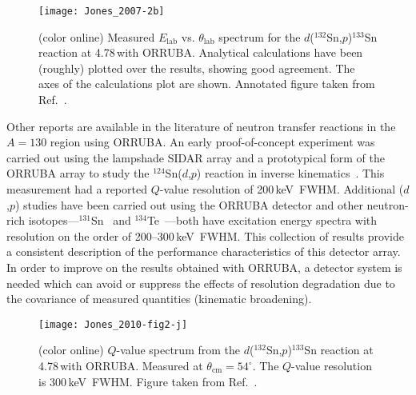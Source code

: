 \begin{figure*}
\begin{center}
\centering
\texttt{[image: Jones\_2007-2b]}
\end{center}
\caption[Measured $E_\mathrm{lab}$ vs. $\theta_\mathrm{lab}$ spectrum for the $d$($^{132}$Sn,$p$)$^{133}$Sn reaction at 4.78\,\AMeV with ORRUBA]{(color online) Measured $E_\mathrm{lab}$ vs. $\theta_\mathrm{lab}$ spectrum for the $d$($^{132}$Sn,$p$)$^{133}$Sn reaction at 4.78\,\AMeV with ORRUBA.   Analytical calculations have been (roughly) plotted over the results, showing good agreement.  The axes of the calculations plot are shown.  Annotated figure taken from Ref.~\cite{Jones_2007}.}%
\label{133Sn_e_spec}%
\end{figure*}
Other reports are available in the literature of neutron transfer reactions in the $A=130$ region using ORRUBA.  An early proof-of-concept experiment was carried out using the lampshade SIDAR array and a prototypical form of the ORRUBA array to study the $^{124}$Sn($d$,$p$) reaction in inverse kinematics~\cite{Jones_2004}.  This measurement had a reported $Q$-value resolution of 200\,keV~FWHM.  %
Additional ($d$,$p$) studies have been carried out using %
the ORRUBA detector and other neutron-rich isotopes---$^{131}$Sn~\cite{Kozub_2008} and $^{134}$Te~\cite{Pain_2008}---both have excitation energy spectra with resolution on the order of 200--300\,keV~FWHM.  This collection of results provide a consistent description of the performance characteristics of this detector array.  In order to improve on the results obtained with ORRUBA, a detector system is needed which can avoid or suppress the effects of resolution degradation due to the covariance of measured quantities (kinematic broadening).

\begin{figure}[hb!]
\begin{center}
\texttt{[image: Jones\_2010-fig2-j]}
\end{center}
\caption[$Q$-value spectrum from the $d$($^{132}$Sn,$p$)$^{133}$Sn reaction at 4.78\,\AMeV with ORRUBA]{(color online) $Q$-value spectrum from the $d$($^{132}$Sn,$p$)$^{133}$Sn reaction at 4.78\,\AMeV with ORRUBA.  Measured at $\theta_\mathrm{cm}=54^\circ$.  The $Q$-value resolution is 300\,keV~FWHM.  Figure taken from Ref.~\cite{Jones_2010}.}%
\label{133Sn_e}%
\end{figure}